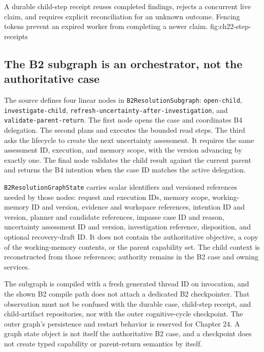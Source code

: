   {A durable child-step receipt reuses completed findings, rejects a concurrent live claim, and requires explicit reconciliation for an unknown outcome. Fencing tokens prevent an expired worker from completing a newer claim.}
  {fig:ch22-step-receipts}

\subsection{The B2 subgraph is an orchestrator, not the authoritative case}
\label{subsec:ch22-b2-subgraph}

The source defines four linear nodes in \texttt{B2\allowbreak Resolution\allowbreak Subgraph}: \texttt{open-child}, \texttt{investigate-\allowbreak child}, \texttt{refresh-\allowbreak uncertainty-\allowbreak after-\allowbreak investigation}, and \texttt{validate-\allowbreak parent-\allowbreak return}. The first node opens the case and coordinates B4 delegation. The second plans and executes the bounded read steps. The third asks the lifecycle to create the next uncertainty assessment. It requires the same assessment ID, execution, and memory scope, with the version advancing by exactly one. The final node validates the child result against the current parent and returns the B4 intention when the case ID matches the active delegation.

\texttt{B2\allowbreak Resolution\allowbreak Graph\allowbreak State} carries scalar identifiers and versioned references needed by those nodes: request and execution IDs, memory scope, working-memory ID and version, evidence and workspace references, intention ID and version, planner and candidate references, impasse case ID and reason, uncertainty assessment ID and version, investigation reference, disposition, and optional recovery-draft ID. It does not contain the authoritative objective, a copy of the working-memory contents, or the parent capability set. The child context is reconstructed from those references; authority remains in the B2 case and owning services.

The subgraph is compiled with a fresh generated thread ID on invocation, and the shown B2 compile path does not attach a dedicated B2 checkpointer. That observation must not be confused with the durable case, child-step receipt, and child-artifact repositories, nor with the outer cognitive-cycle checkpoint. The outer graph's persistence and restart behavior is reserved for Chapter 24. A graph state object is not itself the authoritative B2 case, and a checkpoint does not create typed capability or parent-return semantics by itself.

